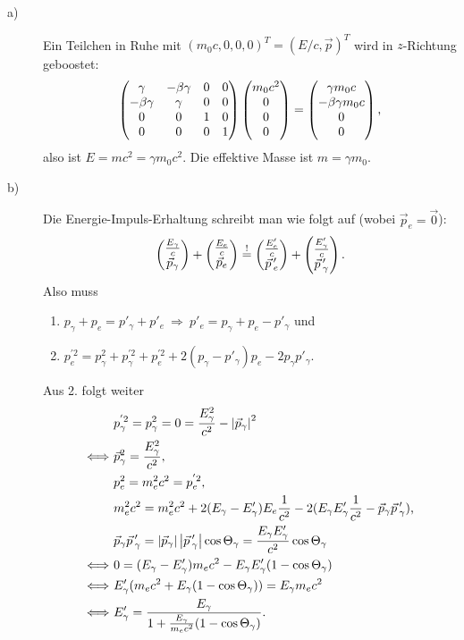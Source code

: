 \begin{description}
	\item[a)] Ein Teilchen in Ruhe mit $(m_0 c, 0, 0, 0)^T = (E / c, \vec{p})^T$ wird in $z$-Richtung geboostet:
	\[
		\begin{pmatrix}
			\gamma & - \beta \gamma & 0 & 0 \\
			- \beta \gamma & \gamma & 0 & 0 \\
			0 & 0 & 1 & 0 \\
			0 & 0 & 0 & 1
		\end{pmatrix}
		\begin{pmatrix} m_0 c^2 \\ 0 \\ 0 \\ 0 \end{pmatrix}
		= \begin{pmatrix} \gamma m_0 c \\ - \beta \gamma m_0 c \\ 0 \\ 0 \end{pmatrix} \text{,}
	\]
	also ist $E = mc^2 = \gamma m_0 c^2$. Die effektive Masse ist $m = \gamma m_0$.
	
	\item[b)] Die Energie-Impuls-Erhaltung schreibt man wie folgt auf (wobei $\vec{p}_e = \vec{0}$):
	\[
		\begin{pmatrix} \frac{E_\gamma}{c} \\ \vec{p}_\gamma \end{pmatrix} + \begin{pmatrix} \frac{E_e}{c} \\ \vec{p}_e \end{pmatrix}
		\overset{!}{=} \begin{pmatrix} \frac{E_e'}{c} \\ \vec{p}\,'_e \end{pmatrix} + \begin{pmatrix} \frac{E_\gamma'}{c} \\ \vec{p}\,'_\gamma \end{pmatrix} 
		\text{.}
	\]
	Also muss 
	\begin{enumerate}
		\item $p_\gamma + p_e = p'_\gamma + p'_e ~\Longrightarrow~ p'_e = p_\gamma + p_e - p'_\gamma$ und 
		\item $p^{'2}_e = p_\gamma^2 + p^{'2}_\gamma + p^{'2}_e + 2 (p_\gamma - p'_\gamma) p_e - 2 p_\gamma p'_\gamma$.
	\end{enumerate}
	
	Aus 2. folgt weiter 
	\begin{align*}
		& p^{'2}_\gamma = p^2_\gamma = 0 = \frac{E^2_\gamma}{c^2} - \left\lvert \vec{p}_\gamma \right\rvert^2 \\
		\Longleftrightarrow~& \vec{p}^2_\gamma = \frac{E^2_\gamma}{c^2} \text{,} \\
		& p^2_e = m^2_e c^2 = p^{'2}_e \text{,} \\
		& m^2_e c^2 = m_e^2 c^2 + 2(E_\gamma - E'_\gamma) E_e \frac{1}{c^2} - 2 (E_\gamma E'_\gamma \frac{1}{c^2} - \vec{p}_\gamma \vec{p}\,'_\gamma) \text{,} \\
		& \vec{p}_\gamma \vec{p}\,'_\gamma = \left\lvert \vec{p}_\gamma \right\rvert \left\lvert \vec{p}\,'_\gamma \right\rvert \cos \Theta_\gamma = \frac{E_\gamma E'_\gamma}{c^2} \cos \Theta_\gamma \\
		\Longleftrightarrow~& 0 = (E_\gamma - E'_\gamma) m_e c^2 - E_\gamma E'_\gamma (1 - \cos \Theta_\gamma) \\
		\Longleftrightarrow~& E'_\gamma (m_e c^2 + E_\gamma (1 - \cos \Theta_\gamma)) = E_\gamma m_e c^2 \\
		\Longleftrightarrow~& E'_\gamma = \frac{E_\gamma}{1 + \frac{E_\gamma}{m_e c^2} (1 - \cos \Theta_\gamma)} \text{.}
	\end{align*}


\end{description}
